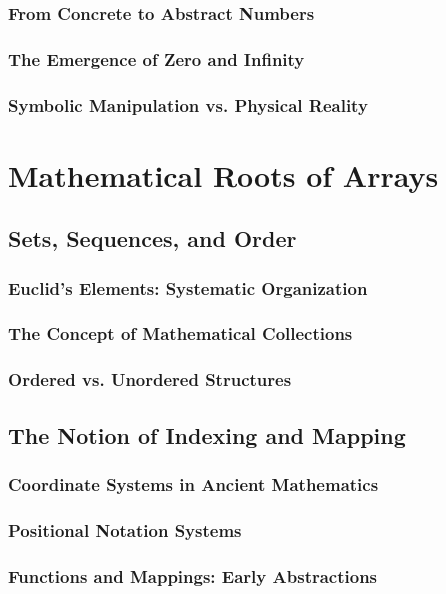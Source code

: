 \documentclass[12pt, oneside, openany]{book}
\begin{document}
\subsubsection{From Concrete to Abstract Numbers}
\subsubsection{The Emergence of Zero and Infinity}
\subsubsection{Symbolic Manipulation vs. Physical Reality}

\section{Mathematical Roots of Arrays}
\subsection{Sets, Sequences, and Order}
\subsubsection{Euclid's Elements: Systematic Organization}
\subsubsection{The Concept of Mathematical Collections}
\subsubsection{Ordered vs. Unordered Structures}

\subsection{The Notion of Indexing and Mapping}
\subsubsection{Coordinate Systems in Ancient Mathematics}
\subsubsection{Positional Notation Systems}
\subsubsection{Functions and Mappings: Early Abstractions}
\end{document}
